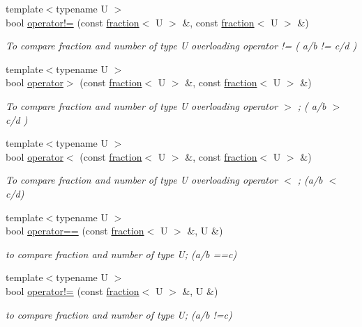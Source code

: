\begin{DoxyCompactItemize}
{\footnotesize template$<$typename U $>$ }\\bool \hyperlink{classfraction_afb3610110503cc780a655a8caee5623b}{operator!=} (const \hyperlink{classfraction}{fraction}$<$ U $>$ \&, const \hyperlink{classfraction}{fraction}$<$ U $>$ \&)
\begin{DoxyCompactList}\small\item\em To compare fraction and number of type U overloading operator != ( a/b != c/d ) \end{DoxyCompactList}\item 
{\footnotesize template$<$typename U $>$ }\\bool \hyperlink{classfraction_a31b15331322cf3ce7e66e1dc4fa2a092}{operator$>$} (const \hyperlink{classfraction}{fraction}$<$ U $>$ \&, const \hyperlink{classfraction}{fraction}$<$ U $>$ \&)
\begin{DoxyCompactList}\small\item\em To compare fraction and number of type U overloading operator $>$ ; ( a/b $>$ c/d ) \end{DoxyCompactList}\item 
{\footnotesize template$<$typename U $>$ }\\bool \hyperlink{classfraction_a0b07c4f8bf755c5d0a4918a86bd2f662}{operator$<$} (const \hyperlink{classfraction}{fraction}$<$ U $>$ \&, const \hyperlink{classfraction}{fraction}$<$ U $>$ \&)
\begin{DoxyCompactList}\small\item\em To compare fraction and number of type U overloading operator $<$ ; (a/b $<$ c/d) \end{DoxyCompactList}\item 
{\footnotesize template$<$typename U $>$ }\\bool \hyperlink{classfraction_a09254b21ac58c2703eb6ebc57fdd99c4}{operator==} (const \hyperlink{classfraction}{fraction}$<$ U $>$ \&, U \&)
\begin{DoxyCompactList}\small\item\em to compare fraction and number of type U; (a/b ==c) \end{DoxyCompactList}\item 
{\footnotesize template$<$typename U $>$ }\\bool \hyperlink{classfraction_acdb9976322ecd40da677e3298e84cff0}{operator!=} (const \hyperlink{classfraction}{fraction}$<$ U $>$ \&, U \&)
\begin{DoxyCompactList}\small\item\em to compare fraction and number of type U; (a/b !=c) \end{DoxyCompactList}\item 

\end{DoxyCompactItemize}
